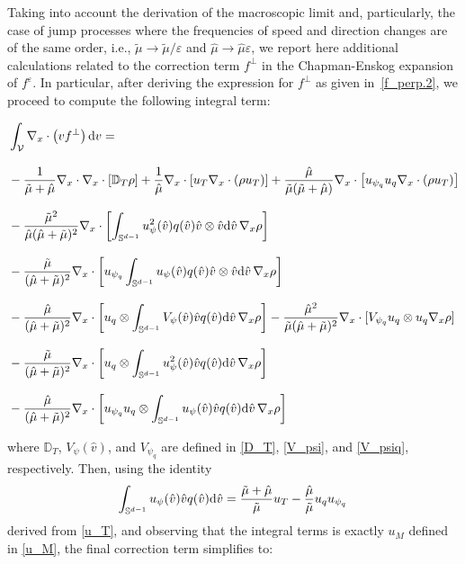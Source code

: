 \documentclass[a4paper]{article}
\theoremstyle{Theorem}\newtheorem{proposition}{Proposition}[section]
\theoremstyle{Remark}\newtheorem{remark}{Remark}[section]
\theoremstyle{Theorem}\newtheorem{theorem}{Theorem}[section]
\newcommand{\hv}{\hat{v}}
\newcommand{\hmu}{\hat{\mu}}
\newcommand{\tmu}{\tilde{\mu}}
\newcommand{\intS}{\int_{\mathbb{S}^{d-1}}}
\newcommand{\intV}{\int_{\mathcal{V}}}
\begin{document}
Taking into account the derivation of the macroscopic limit and, particularly, the case of jump processes where the frequencies of speed and direction changes are of the same order, i.e., $\tmu \to \tmu/\varepsilon$ and $\hmu \to \hmu\varepsilon$, we report here additional calculations related to the correction term $f^\perp$ in the Chapman-Enskog expansion of $f^\varepsilon$. In particular, after deriving the expression for $f^\perp$ as given in~\eqref{f_perp.2}, we proceed to compute the following integral term:
\begin{allowdisplaybreaks}
    \begin{align*}
        &\intV\nabla_x\cdot\left(v f^{\bot}\right){\rm d}v=\\[0.3cm]
        &-\dfrac{1}{\tmu+\hmu}\nabla_x\cdot\nabla_x\cdot\left[\mathbb{D}_T\rho\right]+\dfrac{1}{\hmu}\nabla_x\cdot\left[u_T\nabla_x\cdot(\rho u_T)\right]+\dfrac{\hmu}{\tmu(\tmu+\hmu)}\nabla_x\cdot\left[u_{\psi_q}u_q\nabla_x\cdot(\rho u_T)\right]\\[0.3cm]
        &-\dfrac{\tmu^2}{\hmu(\hmu+\tmu)^2}\nabla_x\cdot\left[\intS u_\psi^2(\hv)q(\hv)\hv\otimes\hv{\rm d}\hv\,\nabla_x\rho\right]\\[0.3cm]
        &-\dfrac{\tmu}{(\hmu+\tmu)^2}\nabla_x\cdot\left[u_{\psi_q}\intS u_\psi(\hv)q(\hv)\hv\otimes\hv{\rm d}\hv\,\nabla_x\rho\right]\\[0.3cm]
        &-\dfrac{\hmu}{(\hmu+\tmu)^2}\nabla_x\cdot\left[u_q\otimes\intS V_\psi(\hv)\hv q(\hv) {\rm d}\hv\,\nabla_x\rho\right]-\dfrac{\hmu^2}{\tmu(\hmu+\tmu)^2}\nabla_x\cdot[V_{\psi_q} u_q\otimes u_q\nabla_x\rho]\\[0.3cm]
        &-\dfrac{\tmu}{(\hmu+\tmu)^2}\nabla_x\cdot\left[u_q\otimes\intS u_\psi^2(\hv)\hv q(\hv){\rm d}\hv\,\nabla_x\rho\right]\\[0.3cm]
        &-\dfrac{\hmu}{(\hmu+\tmu)^2}\nabla_x\cdot\left[u_{\psi_q}u_q\otimes\intS u_\psi(\hv)\hv q(\hv){\rm d}\hv\,\nabla_x\rho\right]
    \end{align*}
\end{allowdisplaybreaks}
where $\mathbb{D}_T$, $V_\psi(\hv)$, and $V_{\psi_q}$ are defined in \eqref{D_T}, \eqref{V_psi}, and \eqref{V_psiq}, respectively. Then, using the identity 
\begin{equation*}\label{baru_q}
\intS u_\psi(\hv)\hv q(\hv){\rm d}\hv=\dfrac{\tmu+\hmu}{\tmu}u_T-\dfrac{\hmu}{\tmu}u_qu_{\psi_q}\,
\end{equation*}
derived from \eqref{u_T}, and observing that the integral terms is exactly $u_M$ defined in \eqref{u_M}, the final correction term simplifies to: 
\end{document}

